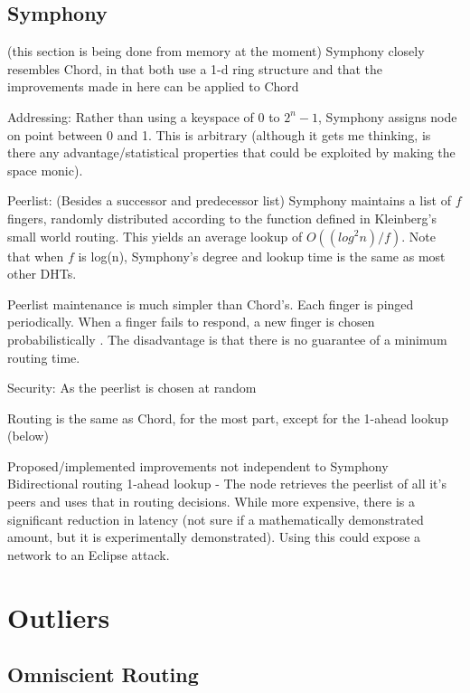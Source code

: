 \documentclass[10pt,letterpaper]{report}
\begin{document}
\cite{kleinberg2000navigation}
\cite{kleinberg2000small}

\section{Symphony}

(this section is being done from memory at the moment)
Symphony closely resembles Chord, in that both use a 1-d ring structure and that the improvements made in here can be applied to Chord

Addressing:  Rather than using a keyspace of 0 to $2^n - 1$, Symphony assigns node on point between 0 and 1.  This is arbitrary (although it gets me thinking, is there any advantage/statistical properties   that could be exploited by making the space monic).

Peerlist:  (Besides a successor and predecessor list) Symphony maintains a list of $f$ fingers, randomly distributed according to the function defined in Kleinberg's small world routing.  This yields an average lookup of $O((log^{2} n)/f)$.  Note that when $f$ is log(n), Symphony's degree and lookup time is the same as most other DHTs.  

Peerlist maintenance is much simpler than Chord's.  Each finger is pinged periodically.  When a finger fails to respond, a new finger is chosen probabilistically .  The disadvantage is that there is no guarantee of a minimum routing time.

Security:  As the peerlist is chosen at random

Routing  is the same as Chord, for the most part, except for the 1-ahead lookup (below)



Proposed/implemented improvements not independent to Symphony
Bidirectional routing
1-ahead lookup - The node retrieves the peerlist of all it's peers and uses that in routing decisions.  While more expensive, there is a significant reduction in latency (not sure if a mathematically demonstrated amount, but it is experimentally demonstrated).  Using this could expose a network to an Eclipse attack.


\chapter{Outliers}
\section{Omniscient Routing}
\end{document}
